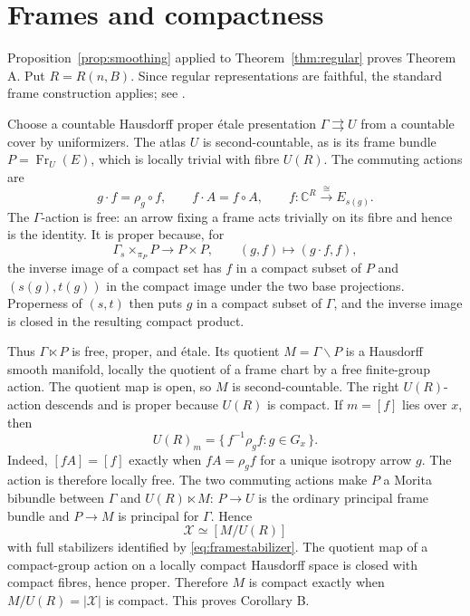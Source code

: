 \documentclass[11pt,a4paper,reqno]{amsart}
\numberwithin{equation}{section}
\theoremstyle{remark}
\theoremstyle{plain}
\newcommand{\X}{\mathcal X}
\newcommand{\C}{\mathbb C}
\newcommand{\Fr}{\operatorname{Fr}}
\begin{document}
\section{Frames and compactness}\label{sec:frames}

Proposition~\ref{prop:smoothing} applied to Theorem~\ref{thm:regular} proves
Theorem A. Put $R=R(n,B)$. Since regular representations are faithful, the
standard frame construction applies; see \cite[\S4]{Kalisnik}.

Choose a countable Hausdorff proper \'etale presentation
$\Gamma\rightrightarrows U$ from a countable cover by uniformizers.
The atlas $U$ is second-countable, as is its frame bundle $P=\Fr_U(E)$,
which is locally trivial with fibre $U(R)$. The commuting actions are
\[
 g\cdot f=\rho_g\circ f,
 \qquad f\cdot A=f\circ A,
 \qquad f:\C^R\xrightarrow{\cong}E_{s(g)}.
\]
The $\Gamma$-action is free: an arrow fixing a frame acts trivially on its
fibre and hence is the identity. It is proper because, for
\[
 \Gamma\mathbin{{}_s\!\times_{\pi_P}}P\longrightarrow P\times P,
 \qquad(g,f)\longmapsto(g\cdot f,f),
\]
the inverse image of a compact set has $f$ in a compact subset of $P$ and
$(s(g),t(g))$ in the compact image under the two base projections. Properness
of $(s,t)$ then puts $g$ in a compact subset of $\Gamma$, and the inverse
image is closed in the resulting compact product.

Thus $\Gamma\ltimes P$ is free, proper, and \'etale. Its quotient
$M=\Gamma\backslash P$ is a Hausdorff smooth manifold, locally the quotient
of a frame chart by a free finite-group action. The quotient map is open, so
$M$ is second-countable. The right $U(R)$-action descends and is proper because
$U(R)$ is compact. If $m=[f]$ lies over $x$,
then
\begin{equation}\label{eq:framestabilizer}
 U(R)_m=\{\,f^{-1}\rho_gf:g\in G_x\,\}.
\end{equation}
Indeed, $[fA]=[f]$ exactly when $fA=\rho_gf$ for a unique isotropy arrow $g$.
The action is therefore locally free. The two commuting actions make $P$ a Morita bibundle between $\Gamma$ and
$U(R)\ltimes M$: $P\to U$ is the ordinary principal frame bundle and
$P\to M$ is principal for $\Gamma$. Hence
\[
 \X\simeq[M/U(R)]
\]
with full stabilizers identified by \eqref{eq:framestabilizer}. The quotient
map of a compact-group action on a locally compact Hausdorff space is closed
with compact fibres, hence proper. Therefore $M$ is compact exactly when
$M/U(R)=|\X|$ is compact. This proves Corollary B.
\end{document}
